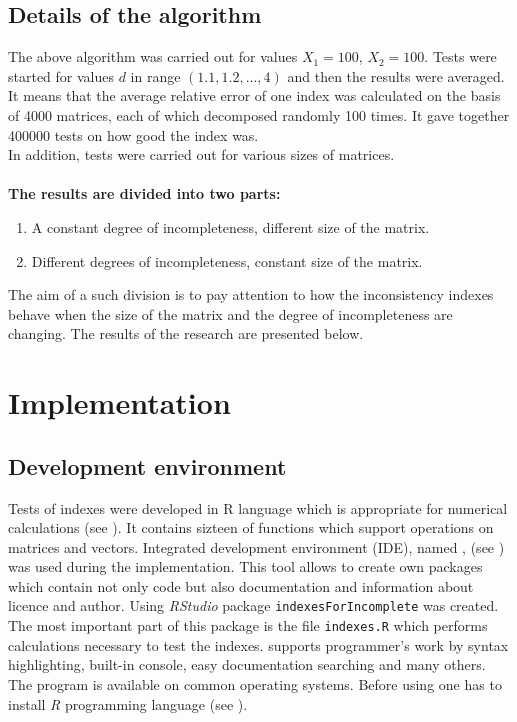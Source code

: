 \subsection{Details of the algorithm}
\label{sec:details}
The above algorithm was carried out for values $X_{1}=100$, $X_{2}=100$. Tests were started for values $d$ in range $\left(1.1,1.2,...,4\right)$ and then the results were averaged. It means that the average relative error of one index was calculated on the basis of 4000 matrices, each of which decomposed randomly 100 times. It gave together 400000 tests on how good the index was. 
\\
In addition, tests were carried out for various sizes of matrices.
\\
\\
\textbf{The results are divided into two parts:}
\begin{enumerate}
  \item A constant degree of incompleteness, different size of the matrix.
  \item Different degrees of incompleteness, constant size of the matrix.
\end{enumerate}

The aim of a such division is to pay attention to how the inconsistency indexes behave when the size of the matrix and the degree of incompleteness are changing. The results of the research are presented below.


\section{Implementation}

\subsection{Development environment}
Tests of indexes were developed in R language which is appropriate for numerical calculations (see \cite{projectR}). It contains sizteen of functions which support operations on matrices and vectors. Integrated development environment (IDE), named , (see \cite{studioR}) was used during the implementation. This tool allows to create own packages which contain not only code but also documentation and information about licence and author. Using \textit{RStudio} package \texttt{indexesForIncomplete} was created. The most important part of this package is the file \texttt{indexes.R} which performs calculations necessary to test the indexes.  supports programmer's work by syntax highlighting, built-in console, easy documentation searching and many others. The program is available on common operating systems. Before using  one has to install \textit{R} programming language (see \cite{installR}).  



